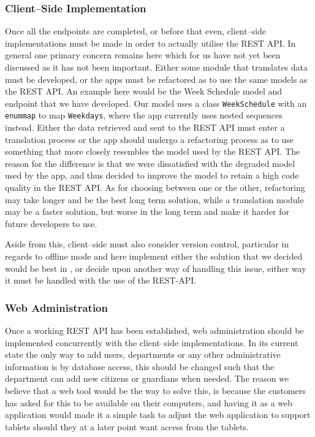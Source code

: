 \subsubsection*{Client--Side Implementation}
Once all the endpoints are completed, or before that even, client--side implementations must be made in order to actually utilise the REST API.
In general one primary concern remains here which for us have not yet been discussed as it has not been important.
Either some module that translates data must be developed, or the apps must be refactored as to use the same models as the REST API.
An example here would be the Week Schedule model and endpoint that we have developed.
Our model uses a class \texttt{WeekSchedule} with an \texttt{enummap} to map \texttt{Weekdays}, where the app currently uses nested sequences instead.
Either the data retrieved and sent to the REST API must enter a translation process or the app should undergo a refactoring process as to use something that more closely resembles the model used by the REST API.
The reason for the difference is that we were dissatisfied with the degraded model used by the app, and thus decided to improve the model to retain a high code quality in the REST API.
As for choosing between one or the other, refactoring may take longer and be the best long term solution, while a translation module may be a faster solution, but worse in the long term and make it harder for future developers to use.

Aside from this, client--side must also consider version control, particular in regards to offline mode and here implement either the solution that we decided would be best in , or decide upon another way of handling this issue, either way it must be handled with the use of the REST-API.

\subsubsection*{Web Administration}
Once a working REST API has been established, web administration should be implemented concurrently with the client--side implementations.
In its current state the only way to add users, departments or any other administrative information is by database access, this should be changed such that the department can add new citizens or guardians when needed.
The reason we believe that a web tool would be the way to solve this, is because the customers has asked for this to be available on their computers, and having it as a web application would made it a simple task to adjust the web application to support tablets should they at a later point want access from the tablets.

